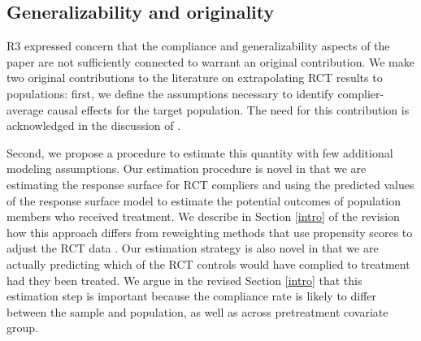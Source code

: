 \documentclass[hidelinks,12pt,letterpaper]{article}
\begin{document}
\subsection{Generalizability and originality}


R3 expressed concern that the compliance and generalizability aspects of the paper are not sufficiently connected to warrant an original contribution. We make two original contributions to the literature on extrapolating RCT results to populations: first, we define the assumptions necessary to identify complier-average causal effects for the target population. The need for this contribution is acknowledged in the discussion of \citet{Hartman}. 

Second, we propose a procedure to estimate this quantity with few additional modeling assumptions. Our estimation procedure is novel in that we are estimating the response surface for RCT compliers and using the predicted values of the response surface model to estimate the potential outcomes of population members who received treatment. We describe in Section \ref{intro} of the revision how this approach differs from reweighting methods that use propensity scores to adjust the RCT data \citep[e.g.,][]{stuart2011use}. Our estimation strategy is also novel in that we are actually predicting which of the RCT controls would have complied to treatment had they been treated. We argue in the revised Section \ref{intro} that this estimation step is important because the compliance rate is likely to differ between the sample and population, as well as across pretreatment covariate group. 
\end{document}
